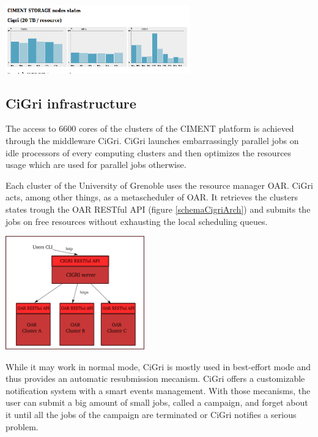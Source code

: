 \documentclass[a4paper, 10pt]{article}
\begin{document}
\begin{multicols}{2}
\begin{center}%
\centering
{}
\includegraphics[width=8cm]{schemaCimentStorageStatus.png}
\end{center}


\subsection{CiGri infrastructure}

The access to 6600 cores of the clusters of the CIMENT platform is achieved through the middleware CiGri.
CiGri launches embarrassingly parallel jobs on idle processors of every computing clusters and then optimizes the resources usage which are used for parallel jobs otherwise.

Each cluster of the University of Grenoble uses the resource manager OAR. CiGri acts, among other things, as a metascheduler of OAR.
It retrieves the clusters states trough the OAR RESTful API (figure \ref{schemaCigriArch}) and submits the jobs on free resources without exhausting the local scheduling queues.

\begin{center}%
\centering
{}
\includegraphics[width=6cm]{cigri_arch.png}
\end{center}

While it may work in normal mode, CiGri is mostly used in best-effort mode and thus provides an automatic resubmission mecanism. CiGri offers a customizable notification system with a smart events management. With those mecanisms, the user can submit a big amount of small jobs, called a campaign, and forget about it until all the jobs of the campaign are terminated or CiGri notifies a serious problem.


\end{multicols}
\end{document}

